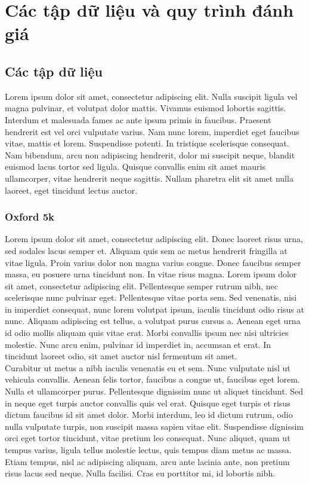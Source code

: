 \chapter{Các tập dữ liệu và quy trình đánh giá}
\ifpdf
    \graphicspath{{Chapter3/Chapter3Figs/PNG/}{Chapter3/Chapter3Figs/PDF/}{Chapter3/Chapter3Figs/}}
\else
    \graphicspath{{Chapter3/Chapter3Figs/EPS/}{Chapter3/Chapter3Figs/}}
\fi

\section{Các tập dữ liệu}
Lorem ipsum dolor sit amet, consectetur adipiscing elit. Nulla suscipit ligula vel magna pulvinar, et volutpat dolor mattis. Vivamus euismod lobortis sagittis. Interdum et malesuada fames ac ante ipsum primis in faucibus. Praesent hendrerit est vel orci vulputate varius. Nam nunc lorem, imperdiet eget faucibus vitae, mattis et lorem. Suspendisse potenti. In tristique scelerisque consequat. Nam bibendum, arcu non adipiscing hendrerit, dolor mi suscipit neque, blandit euismod lacus tortor sed ligula. Quisque convallis enim sit amet mauris ullamcorper, vitae hendrerit neque sagittis. Nullam pharetra elit sit amet nulla laoreet, eget tincidunt lectus auctor.

\subsection{Oxford 5k}
Lorem ipsum dolor sit amet, consectetur adipiscing elit. Donec laoreet risus urna, sed sodales lacus semper et. Aliquam quis sem ac metus hendrerit fringilla at vitae ligula. Proin varius dolor non magna varius congue. Donec faucibus semper massa, eu posuere urna tincidunt non. In vitae risus magna. Lorem ipsum dolor sit amet, consectetur adipiscing elit. Pellentesque semper rutrum nibh, nec scelerisque nunc pulvinar eget. Pellentesque vitae porta sem. Sed venenatis, nisi in imperdiet consequat, nunc lorem volutpat ipsum, iaculis tincidunt odio risus at nunc. Aliquam adipiscing est tellus, a volutpat purus cursus a. Aenean eget urna id odio mollis aliquam quis vitae erat. Morbi convallis ipsum nec nisi ultricies molestie. Nunc arcu enim, pulvinar id imperdiet in, accumsan et erat. In tincidunt laoreet odio, sit amet auctor nisl fermentum sit amet.\\

Curabitur ut metus a nibh iaculis venenatis eu et sem. Nunc vulputate nisl ut vehicula convallis. Aenean felis tortor, faucibus a congue ut, faucibus eget lorem. Nulla et ullamcorper purus. Pellentesque dignissim nunc ut aliquet tincidunt. Sed in neque eget turpis auctor convallis quis vel erat. Quisque eget turpis et risus dictum faucibus id sit amet dolor. Morbi interdum, leo id dictum rutrum, odio nulla vulputate turpis, non suscipit massa sapien vitae elit. Suspendisse dignissim orci eget tortor tincidunt, vitae pretium leo consequat. Nunc aliquet, quam ut tempus varius, ligula tellus molestie lectus, quis tempus diam metus ac massa. Etiam tempus, nisl ac adipiscing aliquam, arcu ante lacinia ante, non pretium risus lacus sed neque. Nulla facilisi. Cras eu porttitor mi, id lobortis nibh.

